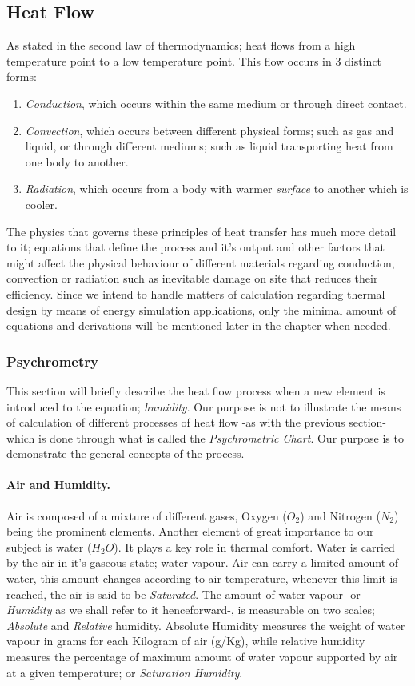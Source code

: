 \documentclass[a4paper,twoside,12pt,openright,final,oldfontcommands]{memoir}
\begin{document}
\subsection{Heat Flow}
As stated in the second law of thermodynamics; heat flows from a high temperature point to a low
temperature point. This flow occurs in 3 distinct forms:
\begin{enumerate}\label{HeatExchange}
  \item \emph{Conduction}, which occurs within the same medium or through direct contact.
  \item \emph{Convection}, which occurs between different physical forms; such as gas and liquid, or
  through different mediums; such as liquid transporting heat from one body to another.
  \item \emph{Radiation}, which occurs from a body with warmer \emph{surface} to another which is
  cooler.
 
\end{enumerate}

The physics that governs these principles of heat transfer has much more detail to it; equations
that define the process and it's output and other factors that might affect the physical behaviour
of different materials regarding conduction, convection or radiation such as inevitable damage on
site that reduces their efficiency. Since we intend to handle matters of calculation regarding
thermal design by means of energy simulation applications, only the minimal amount of equations and
derivations will be mentioned later in the chapter when needed.

\subsubsection{Psychrometry}
This section will briefly describe the heat flow process when a new element is introduced to the
equation; \emph{humidity}. Our purpose is not to illustrate the means of calculation of different
processes of heat flow -as with the previous section- which is done through what is called the
\emph{Psychrometric Chart}. Our purpose is to demonstrate the general concepts of the process.
\paragraph{Air and Humidity.} Air is composed of a mixture of different gases, Oxygen ($O_2$) and
Nitrogen ($N_2$) being the prominent elements. Another element of great importance to our subject is
water ($H_2O$). It plays a key role in thermal comfort. Water is carried by the air in it's gaseous
state; water vapour. Air can carry a limited amount of water, this amount changes according to air
temperature, whenever this limit is reached, the air is said to be \emph{Saturated}. The amount of water vapour -or
\emph{Humidity} as we shall refer to it henceforward-, is measurable on two scales;
\emph{Absolute} and \emph{Relative} humidity. Absolute Humidity measures the weight of water vapour
in grams for each Kilogram of air (g/Kg), while relative humidity measures the percentage of maximum
amount of water vapour supported by air at a given temperature; or \emph{Saturation Humidity}.
\end{document}
